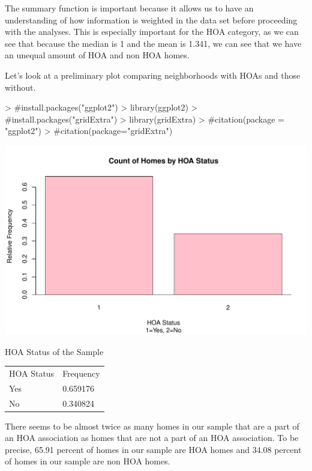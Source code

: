\documentclass{article}
\begin{document}
The summary function is important because it allows us to have an understanding of how information is weighted in the data set before proceeding with the analyses. This is especially important for the HOA category, as we can see that because the median is 1 and the mean is 1.341, we can see that we have an unequal amount of HOA and non HOA homes. 


Let's look at a preliminary plot comparing neighborhoods with HOAs and those without.
\begin{Schunk}
\begin{Sinput}
> #install.packages("ggplot2")
> library(ggplot2)
> #install.packages("gridExtra")
> library(gridExtra)
> #citation(package = "ggplot2")
> #citation(package="gridExtra")
\end{Sinput}
\end{Schunk}
\cite{ggplot2}
\cite{gridExtra}

\includegraphics{exam1-007}

\begin{center} HOA Status of the Sample \end{center}
\begin{table}[h]
\begin{tabular}{ll}
HOA Status & Frequency \\
Yes        & 0.659176  \\
No         & 0.340824 
\end{tabular}
\end{table}


There seems to be almost twice as many homes in our sample that are a part of an HOA association as homes that are not a part of an HOA association. To be precise, 65.91 percent of homes in our sample are HOA homes and 34.08 percent of homes in our sample are non HOA homes. 
\end{document}
